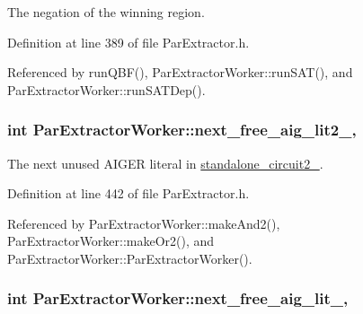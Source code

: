 The negation of the winning region. 



Definition at line 389 of file Par\-Extractor.\-h.



Referenced by run\-Q\-B\-F(), Par\-Extractor\-Worker\-::run\-S\-A\-T(), and Par\-Extractor\-Worker\-::run\-S\-A\-T\-Dep().

\hypertarget{classParExtractorWorker_a334b3096ea7cdb2b3305ac3960aa065a}{
\subsubsection[{next\-\_\-free\-\_\-aig\-\_\-lit2\-\_\-}]{\setlength{\rightskip}{0pt plus 5cm}int Par\-Extractor\-Worker\-::next\-\_\-free\-\_\-aig\-\_\-lit2\-\_\-\hspace{0.3cm}{\ttfamily [protected]}, {\ttfamily [inherited]}}}\label{classParExtractorWorker_a334b3096ea7cdb2b3305ac3960aa065a}


The next unused A\-I\-G\-E\-R literal in \hyperlink{classParExtractorWorker_a304c66039a45652e273876f7c6da8bcf}{standalone\-\_\-circuit2\-\_\-}. 



Definition at line 442 of file Par\-Extractor.\-h.



Referenced by Par\-Extractor\-Worker\-::make\-And2(), Par\-Extractor\-Worker\-::make\-Or2(), and Par\-Extractor\-Worker\-::\-Par\-Extractor\-Worker().

\hypertarget{classParExtractorWorker_a07219034862a2f4dabe22ecdc0d04ae0}{
\subsubsection[{next\-\_\-free\-\_\-aig\-\_\-lit\-\_\-}]{\setlength{\rightskip}{0pt plus 5cm}int Par\-Extractor\-Worker\-::next\-\_\-free\-\_\-aig\-\_\-lit\-\_\-\hspace{0.3cm}{\ttfamily [protected]}, {\ttfamily [inherited]}}}\label{classParExtractorWorker_a07219034862a2f4dabe22ecdc0d04ae0}



